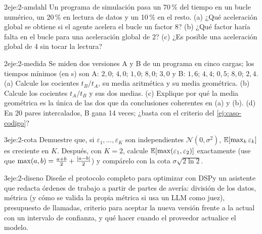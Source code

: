\begin{ejercicio}{2}{eje:2-amdahl}
Un programa de simulación pasa un 70\,\% del tiempo en un bucle numérico, un 20\,\% en lectura de datos y un 10\,\% en el resto. (a) ¿Qué aceleración global se obtiene si el agente acelera el bucle un factor 8? (b) ¿Qué factor haría falta en el bucle para una aceleración global de 2? (c) ¿Es posible una aceleración global de 4 sin tocar la lectura?
\end{ejercicio}

\begin{ejercicio}{2}{eje:2-medida}
Se miden dos versiones A y B de un programa en cinco cargas; los tiempos mínimos (en s) son A: $2{,}0$; $4{,}0$; $1{,}0$; $8{,}0$; $3{,}0$ y B: $1{,}6$; $4{,}4$; $0{,}5$; $8{,}0$; $2{,}4$. (a) Calcule los cocientes $t_B/t_A$, su media aritmética y su media geométrica. (b) Calcule los cocientes $t_A/t_B$ y sus dos medias. (c) Explique por qué la media geométrica es la única de las dos que da conclusiones coherentes en (a) y (b). (d) En 20 pares intercalados, B gana 14 veces; ¿basta con el criterio del \cref{ej:caso-codigo}?
\end{ejercicio}

\begin{ejercicio}{3}{eje:2-cota}
Demuestre que, si $\varepsilon_1,\dots,\varepsilon_K$ son independientes $\mathcal{N}(0,\sigma^{2})$, $\mathbb{E}[\max_k\varepsilon_k]$ es creciente en $K$. Después, con $K=2$, calcule $\mathbb{E}[\max(\varepsilon_1,\varepsilon_2)]$ exactamente (use que $\max(a,b)=\frac{a+b}{2}+\frac{\lvert a-b\rvert}{2}$) y compárelo con la cota $\sigma\sqrt{2\ln 2}$.
\end{ejercicio}

\begin{ejercicio}{3}{eje:2-diseno}
Diseñe el protocolo completo para optimizar con DSPy un asistente que redacta órdenes de trabajo a partir de partes de avería: división de los datos, métrica (y cómo se valida la propia métrica si usa un LLM como juez), presupuesto de llamadas, criterio para aceptar la nueva versión frente a la actual con un intervalo de confianza, y qué hacer cuando el proveedor actualice el modelo.
\end{ejercicio}
